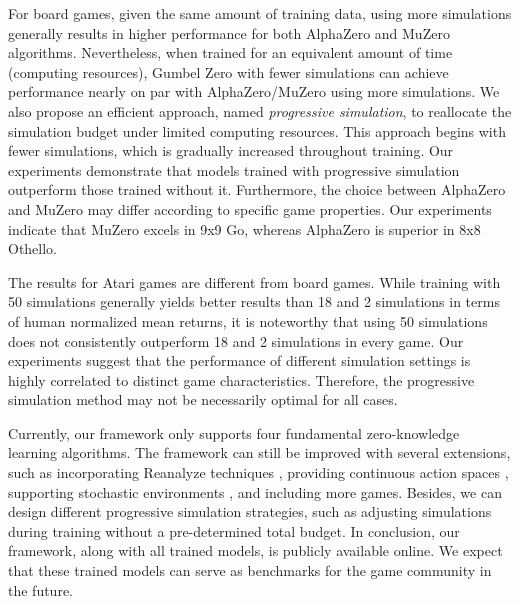 For board games, given the same amount of training data, using more simulations generally results in higher performance for both AlphaZero and MuZero algorithms.
Nevertheless, when trained for an equivalent amount of time (computing resources), Gumbel Zero with fewer simulations can achieve performance nearly on par with AlphaZero/MuZero using more simulations.
We also propose an efficient approach, named \textit{progressive simulation}, to reallocate the simulation budget under limited computing resources.
This approach begins with fewer simulations, which is gradually increased throughout training.
Our experiments demonstrate that models trained with progressive simulation outperform those trained without it.
Furthermore, the choice between AlphaZero and MuZero may differ according to specific game properties.
Our experiments indicate that MuZero excels in 9x9 Go, whereas AlphaZero is superior in 8x8 Othello.

The results for Atari games are different from board games.
While training with 50 simulations generally yields better results than 18 and 2 simulations in terms of human normalized mean returns, it is noteworthy that using 50 simulations does not consistently outperform 18 and 2 simulations in every game.
Our experiments suggest that the performance of different simulation settings is highly correlated to distinct game characteristics.
Therefore, the progressive simulation method may not be necessarily optimal for all cases.


Currently, our framework only supports four fundamental zero-knowledge learning algorithms.
The framework can still be improved with several extensions, such as incorporating Reanalyze techniques \cite{schrittwieser_mastering_2020}, providing continuous action spaces \cite{antonoglou_planning_2021}, supporting stochastic environments \cite{hubert_learning_2021}, and including more games. 
Besides, we can design different progressive simulation strategies, such as adjusting simulations during training without a pre-determined total budget.
In conclusion, our framework, along with all trained models, is publicly available online.
We expect that these trained models can serve as benchmarks for the game community in the future.




\clearpage

\clearpage



